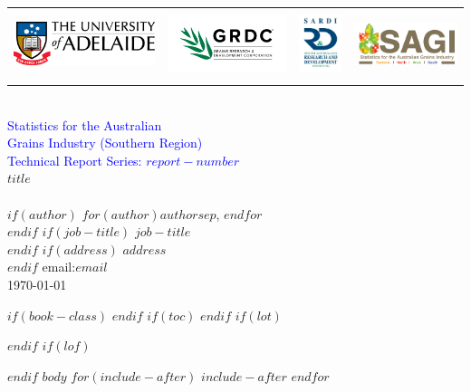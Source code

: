 \documentclass[$if(fontsize)$$fontsize$,$endif$$if(lang)$$lang$,$endif$$if(papersize)$$papersize$,$endif$$for(classoption)$$classoption$$sep$,$endfor$]{$documentclass$}
\begin{document}

\thispagestyle{empty}
\vspace*{30mm}
\begin{flushright}
\HRule\\[5mm]


\begin{tabular}{rrrr}
\includegraphics[height = 1.5cm]{UoA}  &
\includegraphics[height = 2.0cm]{GRDC} &
\includegraphics[height = 2.0cm]{SARDI} &
\includegraphics[height = 1.5cm]{SAGI-STH}
\end{tabular}\\[5mm]

\huge
\textcolor{blue}{\sbf Statistics for the Australian\\
Grains Industry (Southern Region)\\ Technical Report Series: $report-number$}\\[6mm]

{\sbf $title$}\\
\Large
\vspace{2mm}{\sbf $subtitle$}\\[5mm]

\sf\normalsize
$if(author)$
$for(author)$$author$$sep$, $endfor$\\
$endif$
$if(job-title)$
$job-title$\\
$endif$
$if(address)$
$address$\\
$endif$
email:\;$email$\\[8mm]

\today\\
\HRule
\end{flushright}


\clearpage
$if(book-class)$
\frontmatter
$endif$
$if(toc)$
\pagestyle{plain}
\setcounter{page}{1}
\setcounter{tocdepth}{2}
\tableofcontents
\clearpage
$endif$
$if(lot)$
\listoftables
$endif$
$if(lof)$
\listoffigures
$endif$
$body$
$for(include-after)$
$include-after$
$endfor$
\end{document}

